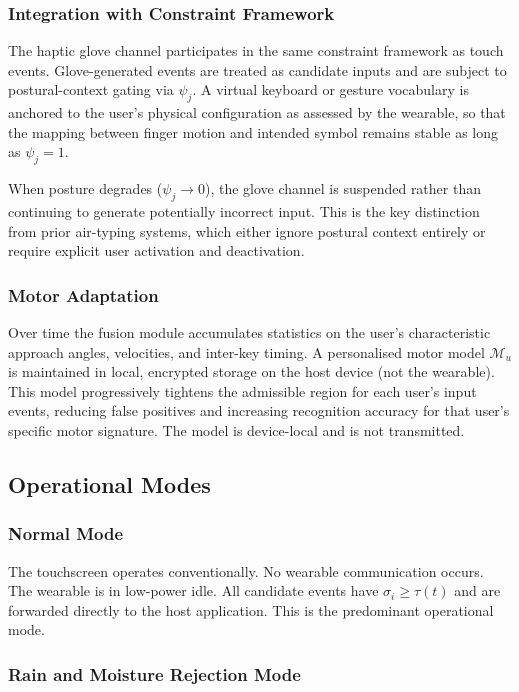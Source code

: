 \documentclass[11pt,letterpaper]{article}
\begin{document}
\subsubsection{Integration with Constraint Framework}

The haptic glove channel participates in the same constraint framework as touch
events. Glove-generated events are treated as candidate inputs and are subject to
postural-context gating via $\psi_j$. A virtual keyboard or gesture vocabulary is
anchored to the user's physical configuration as assessed by the wearable, so that
the mapping between finger motion and intended symbol remains stable as long as
$\psi_j = 1$.

When posture degrades ($\psi_j \to 0$), the glove channel is suspended rather than
continuing to generate potentially incorrect input. This is the key distinction from
prior air-typing systems, which either ignore postural context entirely or require
explicit user activation and deactivation.

\subsubsection{Motor Adaptation}

Over time the fusion module accumulates statistics on the user's characteristic
approach angles, velocities, and inter-key timing. A personalised motor model
$\mathcal{M}_u$ is maintained in local, encrypted storage on the host device (not
the wearable). This model progressively tightens the admissible region for each
user's input events, reducing false positives and increasing recognition accuracy
for that user's specific motor signature. The model is device-local and is not
transmitted.

\subsection{Operational Modes}

\subsubsection{Normal Mode}

The touchscreen operates conventionally. No wearable communication occurs. The
wearable is in low-power idle. All candidate events have $\sigma_i \geq \tau(t)$
and are forwarded directly to the host application. This is the predominant
operational mode.

\subsubsection{Rain and Moisture Rejection Mode}
\end{document}
